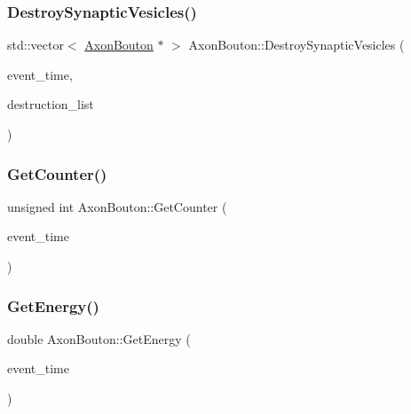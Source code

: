\mbox{\label{classAxonBouton_a0fa1c238a29d9e2b84b4d9c556452150}} 
\subsubsection{\texorpdfstring{Destroy\+Synaptic\+Vesicles()}{DestroySynapticVesicles()}}
{\footnotesize\ttfamily std\+::vector$<$ \mbox{\hyperlink{classAxonBouton}{Axon\+Bouton}} $\ast$ $>$ Axon\+Bouton\+::\+Destroy\+Synaptic\+Vesicles (\begin{DoxyParamCaption}\item[{std\+::chrono\+::time\+\_\+point$<$ \mbox{\hyperlink{universe_8h_a0ef8d951d1ca5ab3cfaf7ab4c7a6fd80}{Clock}} $>$}]{event\+\_\+time,  }\item[{std\+::vector$<$ \mbox{\hyperlink{classAxonBouton}{Axon\+Bouton}} $\ast$$>$}]{destruction\+\_\+list }\end{DoxyParamCaption})}

\mbox{\label{classAxonBouton_a251fc23f754c077cf43ee68991b81624}} 
\subsubsection{\texorpdfstring{Get\+Counter()}{GetCounter()}}
{\footnotesize\ttfamily unsigned int Axon\+Bouton\+::\+Get\+Counter (\begin{DoxyParamCaption}\item[{std\+::chrono\+::time\+\_\+point$<$ \mbox{\hyperlink{universe_8h_a0ef8d951d1ca5ab3cfaf7ab4c7a6fd80}{Clock}} $>$}]{event\+\_\+time }\end{DoxyParamCaption})\hspace{0.3cm}{\ttfamily [inline]}}

\mbox{\label{classAxonBouton_a8dff077a40565f4e3a34388a6c38a603}} 
\subsubsection{\texorpdfstring{Get\+Energy()}{GetEnergy()}}
{\footnotesize\ttfamily double Axon\+Bouton\+::\+Get\+Energy (\begin{DoxyParamCaption}\item[{std\+::chrono\+::time\+\_\+point$<$ \mbox{\hyperlink{universe_8h_a0ef8d951d1ca5ab3cfaf7ab4c7a6fd80}{Clock}} $>$}]{event\+\_\+time }\end{DoxyParamCaption})\hspace{0.3cm}{\ttfamily [inline]}}

